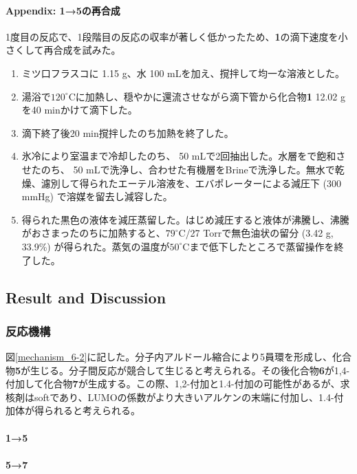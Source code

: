 \documentclass{ltjsarticle}
\theoremstyle{definition}
\numberwithin{equation}{section}
\newcommand{\D}{^\circ\text{C}}
\begin{document}
\paragraph{Appendix: \textbf{1}→\textbf{5}の再合成}
1度目の反応で、1段階目の反応の収率が著しく低かったため、\textbf{1}の滴下速度を小さくして再合成を試みた。
\begin{enumerate}
\item ミツ口フラスコに 1.15 g、水 100 mLを加え、撹拌して均一な溶液とした。
\item 湯浴で$120\D$に加熱し、穏やかに還流させながら滴下管から化合物\textbf{1} 12.02 gを40 minかけて滴下した。 
\item 滴下終了後20 min撹拌したのち加熱を終了した。
\item 氷冷により室温まで冷却したのち、 50 mLで2回抽出した。水層をで飽和させたのち、 50 mLで洗浄し、合わせた有機層をBrineで洗浄した。無水で乾燥、濾別して得られたエーテル溶液を、エバポレーターによる減圧下 (300 mmHg) で溶媒を留去し減容した。
\item 得られた黒色の液体を減圧蒸留した。はじめ減圧すると液体が沸騰し、沸騰がおさまったのちに加熱すると、$79\D$/27 Torrで無色油状の留分 (3.42 g, 33.9\%) が得られた。蒸気の温度が$50\D$まで低下したところで蒸留操作を終了した。
\end{enumerate}

\subsection{Result and Discussion}
\subsubsection{反応機構}
図\ref{mechanism_6-2}に記した。分子内アルドール縮合により5員環を形成し、化合物\textbf{5}が生じる。分子間反応が競合して生じると考えられる。その後化合物\textbf{6}が1,4-付加して化合物\textbf{7}が生成する。この際、1,2-付加と1.4-付加の可能性があるが、求核剤はsoftであり、LUMOの係数がより大きいアルケンの末端に付加し、1.4-付加体が得られると考えられる。


\paragraph{\textbf{1}→\textbf{5}}


\paragraph{\textbf{5}→\textbf{7}}
\end{document}
